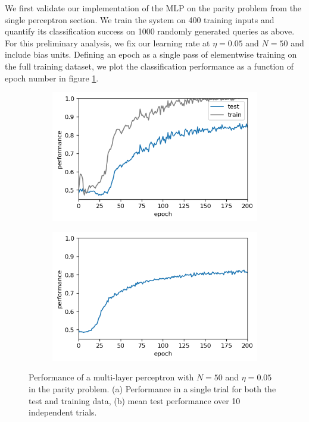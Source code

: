 \documentclass{article}
\begin{document}
We first validate our implementation of the MLP on the parity problem from the single perceptron section. We train the system on 400 training inputs and quantify its classification success on 1000 randomly generated queries as above. For this preliminary analysis, we fix our learning rate at $\eta = 0.05$ and $N = 50$ and include bias units. Defining an epoch as a single pass of elementwise training on the full training dataset, we plot the classification performance as a function of epoch number in figure \ref{fig:mlp_parity}.

\begin{figure}[h]
	\centering
		\begin{subfigure}[t]{0.42\linewidth}
		\centering
		\includegraphics[width = 1.0\linewidth, trim={5 5 5 5}, clip=true]{figures/N50_eta05_nepoch200_transfer_tanh_parity_performance.png}
		\subcaption{}	
	\end{subfigure}%
	\hspace{0.05 \linewidth}
	\begin{subfigure}[t]{0.42\linewidth}
		\centering
		\includegraphics[width = 1.0\linewidth, trim={5 5 5 5}, clip=true]{figures/N50_eta075_nepoch200_ntrial10_transfer_tanh_parity_performance.png}
		\subcaption{}
	\end{subfigure}%
\caption{Performance of a multi-layer perceptron with $N=50$ and $\eta = 0.05$ in the parity problem. (a) Performance in a single trial for both the test and training data, (b) mean test performance over 10 independent trials.}
\label{fig:mlp_parity}
\end{figure}
\end{document}
